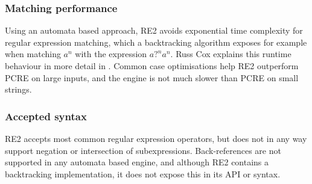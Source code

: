 \subsubsection{Matching performance}

Using an automata based approach, RE2 avoids exponential time complexity for
regular expression matching, which a backtracking algorithm exposes for example
when matching $a^n$ with the expression $a?^na^n$. Russ Cox explains this
runtime behaviour in more detail in \cite{regexp1}. Common case optimisations
help RE2 outperform PCRE on large inputs, and the engine is not much slower than
PCRE on small strings.


\subsubsection{Accepted syntax}

RE2 accepts most common regular expression operators, but does not in any way
support negation or intersection of subexpressions. Back-references are not
supported in any automata based engine, and although RE2 contains a backtracking
implementation, it does not expose this in its API or syntax.


